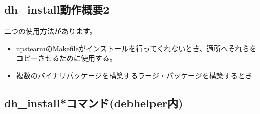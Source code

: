 \documentclass[mingoth,a4paper]{jsarticle}
\begin{document}
\subsection{dh\_install動作概要2}
二つの使用方法があります。
\begin{itemize}
\item upstearmのMakefileがインストールを行ってくれないとき、適所へそれらをコピーさせるために使用する。
\item 複数のバイナリパッケージを構築するラージ・パッケージを構築するとき
\end{itemize}

\newpage

\subsection{dh\_install*コマンド(debhelper内)}
\end{document}
